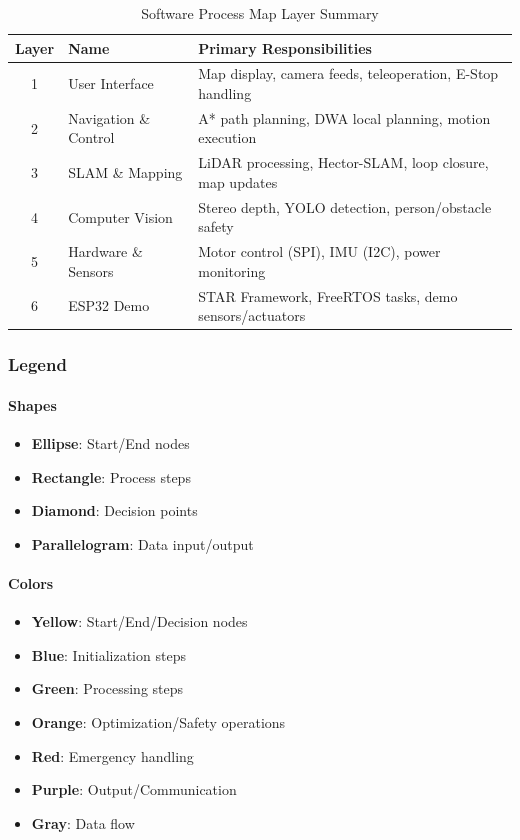 \begin{table}[H]
\centering
\caption{Software Process Map Layer Summary}
\label{tab:process-map-layers}
\begin{tabular}{@{}clp{7cm}@{}}
\toprule
\textbf{Layer} & \textbf{Name} & \textbf{Primary Responsibilities} \\
\midrule
1 & User Interface & Map display, camera feeds, teleoperation, E-Stop handling \\
2 & Navigation \& Control & A* path planning, DWA local planning, motion execution \\
3 & SLAM \& Mapping & LiDAR processing, Hector-SLAM, loop closure, map updates \\
4 & Computer Vision & Stereo depth, YOLO detection, person/obstacle safety \\
5 & Hardware \& Sensors & Motor control (SPI), IMU (I2C), power monitoring \\
6 & ESP32 Demo & STAR Framework, FreeRTOS tasks, demo sensors/actuators \\
\bottomrule
\end{tabular}
\end{table}

\subsubsection{Legend}

\paragraph{Shapes}
\begin{itemize}[nosep]
    \item \textbf{Ellipse}: Start/End nodes
    \item \textbf{Rectangle}: Process steps
    \item \textbf{Diamond}: Decision points
    \item \textbf{Parallelogram}: Data input/output
\end{itemize}

\paragraph{Colors}
\begin{itemize}[nosep]
    \item \textbf{Yellow}: Start/End/Decision nodes
    \item \textbf{Blue}: Initialization steps
    \item \textbf{Green}: Processing steps
    \item \textbf{Orange}: Optimization/Safety operations
    \item \textbf{Red}: Emergency handling
    \item \textbf{Purple}: Output/Communication
    \item \textbf{Gray}: Data flow
\end{itemize}

